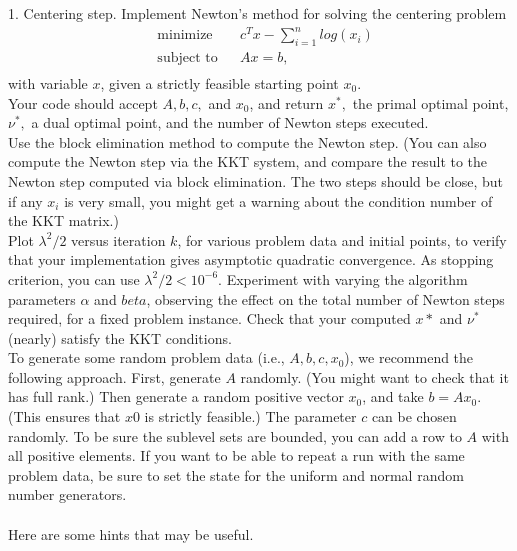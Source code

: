 \documentclass{article}
\begin{document}
1. Centering step. Implement Newton’s method for solving the centering problem
\begin{align*}
	&\text{minimize } && c^T x - \sum_{i = 1}^n log(x_i)\\
	&\text{subject to} && Ax = b,\\
\end{align*}
with variable $x$, given a strictly feasible starting point $x_0.$\\

Your code should accept $A, b, c,$ and $x_0$, and return $x^*,$ the primal optimal point, $\nu^*,$
a dual optimal point, and the number of Newton steps executed.\\

Use the block elimination method to compute the Newton step. (You can also compute the Newton step via the KKT system, and compare the result to the Newton step
computed via block elimination. The two steps should be close, but if any $x_i$ is very
small, you might get a warning about the condition number of the KKT matrix.)\\

Plot $\lambda^2 / 2$ versus iteration $k$, for various problem data and initial points, to verify that
your implementation gives asymptotic quadratic convergence. As stopping criterion,
you can use $\lambda^2 / 2 < 10^{-6}.$ Experiment with varying the algorithm parameters $\alpha$ and $beta$,
observing the effect on the total number of Newton steps required, for a fixed problem
instance. Check that your computed $x*$ and $\nu^*$ (nearly) satisfy the KKT conditions.\\

To generate some random problem data (i.e., $A, b, c, x_0$), we recommend the following
approach. First, generate $A$ randomly. (You might want to check that it has full rank.)
Then generate a random positive vector $x_0$, and take $b = Ax_0.$ (This ensures that $x0$
is strictly feasible.) The parameter $c$ can be chosen randomly. To be sure the sublevel
sets are bounded, you can add a row to $A$ with all positive elements. If you want to
be able to repeat a run with the same problem data, be sure to set the state for the
uniform and normal random number generators. \\ \\
Here are some hints that may be useful. \\ \\
\end{document}
